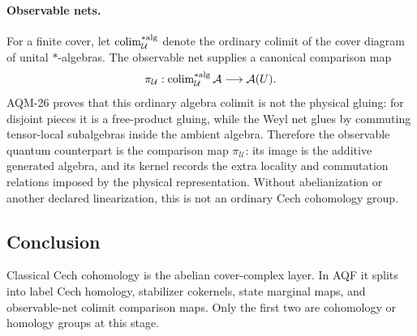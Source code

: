 \paragraph{Observable nets.}
For a finite cover, let \(\operatorname{colim}_{\mathcal U}^{*{\rm alg}}\)
denote the ordinary colimit of the cover diagram of unital \(*\)-algebras.
The observable net supplies a canonical comparison map
\[
  \pi_{\mathcal U}:
  \operatorname{colim}_{\mathcal U}^{*{\rm alg}}\mathcal A
  \longrightarrow
  \mathcal A(U).
\]
AQM-26 proves that this ordinary algebra colimit is not the physical gluing:
for disjoint pieces it is a free-product gluing, while the Weyl net glues by
commuting tensor-local subalgebras inside the ambient algebra.  Therefore the
observable quantum counterpart is the comparison map \(\pi_{\mathcal U}\):
its image is the additive generated algebra, and its kernel records the extra
locality and commutation relations imposed by the physical representation.
Without abelianization or another declared linearization, this is not an
ordinary Cech cohomology group.

\subsection{Conclusion}

Classical Cech cohomology is the abelian cover-complex layer.  In AQF it splits into label Cech homology, stabilizer cokernels, state marginal maps, and observable-net colimit comparison maps.  Only the first two are cohomology or homology groups at this stage.
